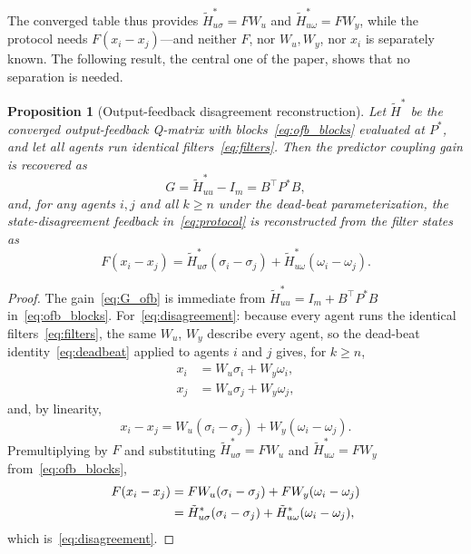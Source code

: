 \documentclass[final,5p,times]{elsarticle}
\theoremstyle{plain}
\newtheorem{proposition}{Proposition}
\theoremstyle{definition}
\theoremstyle{remark}
\begin{document}
The converged table thus provides $\tilde{H}_{u\sigma}^* = FW_u$ and $\tilde{H}_{u\omega}^* = FW_y$, while the protocol needs $F(x_i - x_j)$---and neither $F$, nor $W_u,W_y$, nor $x_i$ is separately known. The following result, the central one of the paper, shows that no separation is needed.
\begin{proposition}[Output-feedback disagreement reconstruction]
\label{prop:disagreement}
Let $\tilde{H}^*$ be the converged output-feedback Q-matrix with blocks~\eqref{eq:ofb_blocks} evaluated at $P^*$, and let all agents run identical filters~\eqref{eq:filters}. Then the predictor coupling gain is recovered as
\begin{equation}
G = \tilde{H}_{uu}^* - I_m = B^\top P^* B,
\label{eq:G_ofb}
\end{equation}
and, for any agents $i,j$ and all $k \geq n$ under the dead-beat parameterization, the state-disagreement feedback in~\eqref{eq:protocol} is reconstructed from the filter states as
\begin{equation}
F(x_i - x_j) = \tilde{H}_{u\sigma}^*(\sigma_i - \sigma_j) + \tilde{H}_{u\omega}^*(\omega_i - \omega_j).
\label{eq:disagreement}
\end{equation}
\end{proposition}
\begin{proof}
The gain~\eqref{eq:G_ofb} is immediate from $\tilde{H}_{uu}^* = I_m + B^\top P^* B$ in~\eqref{eq:ofb_blocks}. For~\eqref{eq:disagreement}: because every agent runs the identical filters~\eqref{eq:filters}, the same $W_u$, $W_y$ describe every agent, so the dead-beat identity~\eqref{eq:deadbeat} applied to agents $i$ and $j$ gives, for $k \geq n$,
\begin{align}
x_i &= W_u \sigma_i + W_y \omega_i,\\
x_j &= W_u \sigma_j + W_y \omega_j,
\end{align}
and, by linearity,
\begin{equation}
x_i - x_j = W_u(\sigma_i - \sigma_j) + W_y(\omega_i - \omega_j).
\end{equation}
Premultiplying by $F$ and substituting $\tilde{H}_{u\sigma}^* = F W_u$ and $\tilde{H}_{u\omega}^* = F W_y$ from~\eqref{eq:ofb_blocks},
\begin{align}
F(x_i - x_j) &= F W_u(\sigma_i - \sigma_j) + F W_y(\omega_i - \omega_j) \notag\\
&= \tilde{H}_{u\sigma}^*(\sigma_i - \sigma_j) + \tilde{H}_{u\omega}^*(\omega_i - \omega_j),
\end{align}
which is~\eqref{eq:disagreement}.
\end{proof}
\end{document}

